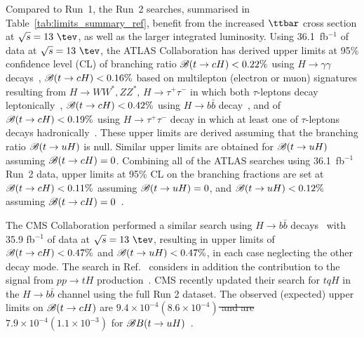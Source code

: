 \documentclass[PAPER, coverpage, atlasdraft=true, texlive=2016, UKenglish]{\ATLASLATEXPATH atlasdoc} %
\providecommand{\DIFadd}[1]{{\protect\color{blue}\uwave{#1}}} %
\providecommand{\DIFdel}[1]{{\protect\color{red}\sout{#1}}}                      %
\providecommand{\DIFaddbegin}{} %
\providecommand{\DIFaddend}{} %
\providecommand{\DIFdelbegin}{} %
\providecommand{\DIFdelend}{} %
\begin{document}
Compared to Run~1, the Run~2 searches, summarised in Table~\ref{tab:limits_summary_ref}, benefit from the increased $\ttbar$ cross section at $\sqrt{s}=13~\tev$, as well as the larger integrated luminosity.
Using 36.1~fb$^{-1}$ of data at $\sqrt{s}=13~\tev$, the ATLAS Collaboration has derived upper limits at 95\% confidence level (CL) of branching ratio
$\mathscr{B}(t\to cH)<0.22\%$ using $H\to \gamma\gamma$ decays~\cite{Aaboud:2017mfd}, $\mathscr{B}(t\to cH)<0.16\%$ based on
multilepton (electron or muon) signatures resulting from 
$H \to  WW^*, ZZ^*$, $H\to \tau^+\tau^-$ in which both $\tau$-leptons decay leptonically~\cite{Aaboud:2018pob},
$\mathscr{B}(t\to cH)<0.42\%$ using $H\to b\bar{b}$ decay~\cite{fcnc36}, and of $\mathscr{B}(t\to cH)<0.19\%$ using $H\to \tau^+\tau^-$ decay in which at least
one of $\tau$-leptons decays hadronically~\cite{fcnc36}.  
These upper limits are derived assuming that the branching ratio $\mathscr{B}(t\to uH)$ is null. Similar upper limits are obtained for $\mathscr{B}(t\to uH)$ assuming $\mathscr{B}(t\to cH)=0$.
Combining all of the ATLAS searches using 36.1~fb$^{-1}$ Run~2 data, upper limits at 95\% CL on the branching fractions are 
set at $\mathscr{B}(t\to cH)<0.11\%$ assuming $\mathscr{B}(t\to uH)=0$, and $\mathscr{B}(t\to uH)<0.12\%$ assuming $\mathscr{B}(t\to cH)=0$~\cite{fcnc36}.

The CMS Collaboration performed a similar search using  
$H\to b\bar{b}$ decays~\cite{Sirunyan:2017uae} with 35.9 fb$^{-1}$ of data at $\sqrt{s}=13~\tev$, resulting 
in upper limits of $\mathscr{B}(t\to cH)<0.47\%$ and $\mathscr{B}(t\to uH)<0.47\%$, in each case neglecting the other decay mode.
The search in Ref.~\cite{Sirunyan:2017uae} considers in addition the contribution to the signal from 
$pp \to tH$ production~\cite{Greljo:2014dka}. 
CMS recently updated their search for $tqH$ in the $H\to b\bar{b}$ channel using
the full Run 2 dataset. The observed (expected) upper limits on  $\mathscr{B}(t\to cH)$ are \DIFdelbegin \DIFdel{$9.4\times10^{-4}(8.6\times10^{-4})$
and are $7.9\times10^{-4}(1.1\times10^{-3})$ }\DIFdelend \DIFaddbegin \DIFadd{$9.4\times10^{-4}\, (8.6\times10^{-4})$
and are $7.9\times10^{-4}\, (1.1\times10^{-3})$ }\DIFaddend for $\mathscr{B}{B}(t\to uH)$~\cite{CMS:2021gfa}.
\end{document}
